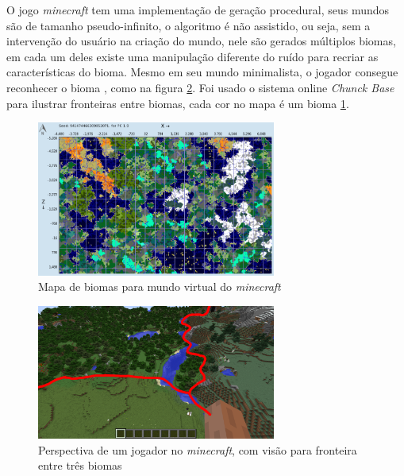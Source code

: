 O jogo \textit{minecraft} tem uma implementação de geração procedural,
seus mundos são de tamanho pseudo-infinito, 
o algoritmo é não assistido, ou seja, sem a intervenção
do usuário na criação do mundo, nele
são gerados múltiplos biomas, em cada um deles existe uma manipulação diferente
do ruído para recriar as características do bioma. Mesmo em seu mundo
minimalista, o jogador consegue reconhecer o bioma \cite{short2012teaching},
como na figura \ref{fig:biomesminecraftgameplay}.
Foi usado o sistema online \textit{Chunck Base} para 
ilustrar fronteiras entre biomas, cada cor no mapa é um bioma \ref{fig:chunkbasebiomes}.


\begin{figure}[H]
    \centering
    \includegraphics[width=0.7\textwidth]{figuras/chunkbasebiomes.png}
    \caption{Mapa de biomas para mundo virtual do \textit{minecraft}}
    \label{fig:chunkbasebiomes}
\end{figure}

\begin{figure}[H]
    \centering
    \includegraphics[width=0.7\textwidth]{figuras/biomesminecraftgameplay.png}
    \caption{Perspectiva de um jogador no \textit{minecraft}, com visão para fronteira entre três biomas}
    \label{fig:biomesminecraftgameplay}
\end{figure}

